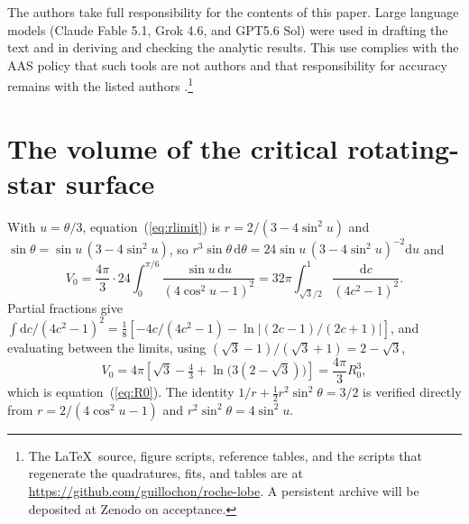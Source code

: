 \documentclass[twocolumn]{aastex702}
\newcommand{\dd}{\mathrm{d}}
\begin{document}
\begin{acknowledgments}
The authors take full responsibility for the contents of this paper. Large language models (Claude Fable 5.1, Grok 4.6, and GPT5.6 Sol) were used in drafting the text and in deriving and checking the analytic results. This use complies with the AAS policy that such tools are not authors and that responsibility for accuracy remains with the listed authors \citep{Vishniac2025}.\footnote{The \LaTeX\ source, figure scripts, reference tables, and the scripts that regenerate the quadratures, fits, and tables are at \url{https://github.com/guillochon/roche-lobe}. A persistent archive will be deposited at Zenodo on acceptance.}
\end{acknowledgments}





\appendix

\section{The volume of the critical rotating-star surface}\label{app:R0}

With $u=\theta/3$, equation~(\ref{eq:rlimit}) is $r=2/(3-4\sin^2u)$ and $\sin\theta=\sin u\,(3-4\sin^2u)$, so $r^3\sin\theta\,\dd\theta=24\sin u\,(3-4\sin^2u)^{-2}\dd u$ and
\begin{equation}
V_0=\frac{4\pi}{3}\cdot24\int_0^{\pi/6}\frac{\sin u\,\dd u}{(4\cos^2u-1)^2}=32\pi\int_{\sqrt3/2}^{1}\frac{\dd c}{(4c^2-1)^2}.
\end{equation}
Partial fractions give $\int\dd c/(4c^2-1)^2=\tfrac18\left[-4c/(4c^2-1)-\ln\left|(2c-1)/(2c+1)\right|\right]$, and evaluating between the limits, using $(\sqrt3-1)/(\sqrt3+1)=2-\sqrt3$,
\begin{equation}
V_0=4\pi\left[\sqrt3-\tfrac43+\ln\!\big(3(2-\sqrt3)\big)\right]=\frac{4\pi}{3}R_0^3,
\end{equation}
which is equation~(\ref{eq:R0}). The identity $1/r+\tfrac12r^2\sin^2\theta=3/2$ is verified directly from $r=2/(4\cos^2u-1)$ and $r^2\sin^2\theta=4\sin^2u$.
\end{document}

